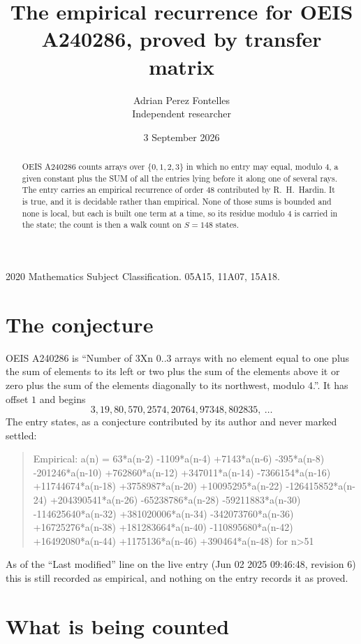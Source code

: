 \documentclass[11pt,a4paper]{article}
\title{The empirical recurrence for OEIS A240286, proved by transfer matrix}
\author{Adrian Perez Fontelles\\ \small Independent researcher}
\date{3 September 2026}
\theoremstyle{plain}
\theoremstyle{definition}
\begin{document}
\maketitle

\begin{abstract}
OEIS A240286 counts arrays over $\{0,1,2,3\}$ in which no entry may equal, modulo $4$, a given
constant plus the SUM of all the entries lying before it along one of several rays. The entry
carries an empirical recurrence of order $48$ contributed by R.~H.~Hardin. It is true, and
it is decidable rather than empirical. None of those sums is bounded and none is local, but
each is built one term at a time, so its residue modulo $4$ is carried in the state; the
count is then a walk count on $S=148$ states.
\end{abstract}

\noindent\small 2020 Mathematics Subject Classification. 05A15, 11A07, 15A18.\normalsize

\section{The conjecture}

OEIS A240286 is ``Number of 3Xn 0..3 arrays with no element equal to one plus the sum of elements to its left or two plus the sum of the elements above it or zero plus the sum of the elements diagonally to its northwest, modulo 4.''. It has offset $1$ and begins
\[
3, 19, 80, 570, 2574, 20764, 97348, 802835,\ \dots
\]
The entry states, as a conjecture contributed by its author and never marked settled:
\begin{quote}
Empirical: a(n) = 63*a(n-2) -1109*a(n-4) +7143*a(n-6) -395*a(n-8) -201246*a(n-10) +762860*a(n-12) +347011*a(n-14) -7366154*a(n-16) +11744674*a(n-18) +3758987*a(n-20) +10095295*a(n-22) -126415852*a(n-24) +204390541*a(n-26) -65238786*a(n-28) -59211883*a(n-30) -114625640*a(n-32) +381020006*a(n-34) -342073760*a(n-36) +16725276*a(n-38) +181283664*a(n-40) -110895680*a(n-42) +16492080*a(n-44) +1175136*a(n-46) +390464*a(n-48) for n>51
\end{quote}
As of the ``Last modified'' line on the live entry (Jun 02 2025 09:46:48, revision 6) this is still
recorded as empirical, and nothing on the entry records it as proved.

\section{What is being counted}
\end{document}
